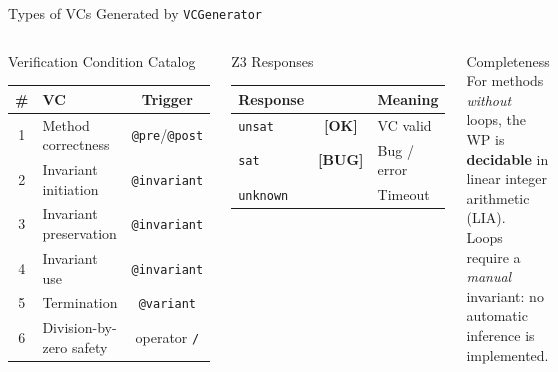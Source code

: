 \documentclass[aspectratio=169,11pt]{beamer}
\newcommand{\ok}{\textcolor{accent}{\textbf{[OK]}}}
\newcommand{\bug}{\textcolor{warn}{\textbf{[BUG]}}}
\begin{document}
\begin{frame}{Types of VCs Generated by \texttt{VCGenerator}}

\begin{columns}[c]
  \begin{block}{Verification Condition Catalog}
    \medskip
    \begin{tabular}{clc}
      \toprule
      \textbf{\#} & \textbf{VC} & \textbf{Trigger}\\
      \midrule
      1 & Method correctness       & \texttt{@pre}/\texttt{@post}\\
      2 & Invariant initiation     & \texttt{@invariant}\\
      3 & Invariant preservation   & \texttt{@invariant}\\
      4 & Invariant use            & \texttt{@invariant}\\
      5 & Termination              & \texttt{@variant}\\
      6 & Division-by-zero safety  & operator \texttt{/}\\
      \bottomrule
    \end{tabular}
    \medskip
  \end{block}

  \begin{exampleblock}{Z3 Responses}
    \medskip
    \begin{tabular}{lcl}
      \toprule
      \textbf{Response} & & \textbf{Meaning}\\
      \midrule
      \texttt{unsat} & \ok   & VC valid\\
      \texttt{sat}   & \bug  & Bug / error\\
      \texttt{unknown} &     & Timeout\\
      \bottomrule
    \end{tabular}
    \medskip
  \end{exampleblock}
  \begin{alertblock}{Completeness}
    \small
    For methods \emph{without} loops, the WP is\\
    \textbf{decidable} in linear integer arithmetic (LIA).\\
    Loops require a \emph{manual} invariant:
    no automatic inference is implemented.
  \end{alertblock}
\end{columns}
\end{frame}
\end{document}
